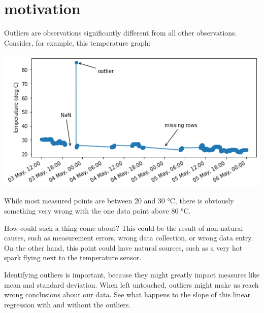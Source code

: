 \documentclass[
  letterpaper,
  DIV=11,
  numbers=noendperiod,
  oneside]{scrreprt}
\begin{document}
\hypertarget{motivation-2}{%
\chapter{motivation}\label{motivation-2}}

Outliers are observations significantly different from all other
observations. Consider, for example, this temperature graph:

\includegraphics{outliers/temp-outlier.png}

While most measured points are between 20 and 30 °C, there is obviously
something very wrong with the one data point above 80 °C.

How could such a thing come about? This could be the result of
non-natural causes, such as measurement errors, wrong data collection,
or wrong data entry. On the other hand, this point could have natural
sources, such as a very hot spark flying next to the temperature sensor.

Identifying outliers is important, because they might greatly impact
measures like mean and standard deviation. When left untouched, outliers
might make us reach wrong conclusions about our data. See what happens
to the slope of this linear regression with and without the outliers.
\end{document}
